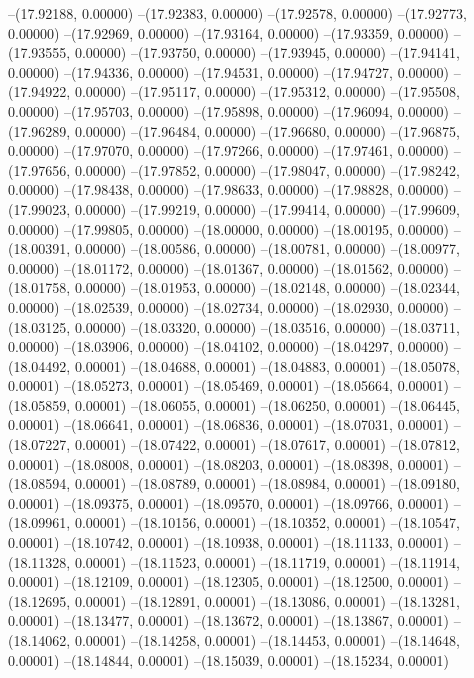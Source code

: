 --(17.92188, 0.00000)
--(17.92383, 0.00000)
--(17.92578, 0.00000)
--(17.92773, 0.00000)
--(17.92969, 0.00000)
--(17.93164, 0.00000)
--(17.93359, 0.00000)
--(17.93555, 0.00000)
--(17.93750, 0.00000)
--(17.93945, 0.00000)
--(17.94141, 0.00000)
--(17.94336, 0.00000)
--(17.94531, 0.00000)
--(17.94727, 0.00000)
--(17.94922, 0.00000)
--(17.95117, 0.00000)
--(17.95312, 0.00000)
--(17.95508, 0.00000)
--(17.95703, 0.00000)
--(17.95898, 0.00000)
--(17.96094, 0.00000)
--(17.96289, 0.00000)
--(17.96484, 0.00000)
--(17.96680, 0.00000)
--(17.96875, 0.00000)
--(17.97070, 0.00000)
--(17.97266, 0.00000)
--(17.97461, 0.00000)
--(17.97656, 0.00000)
--(17.97852, 0.00000)
--(17.98047, 0.00000)
--(17.98242, 0.00000)
--(17.98438, 0.00000)
--(17.98633, 0.00000)
--(17.98828, 0.00000)
--(17.99023, 0.00000)
--(17.99219, 0.00000)
--(17.99414, 0.00000)
--(17.99609, 0.00000)
--(17.99805, 0.00000)
--(18.00000, 0.00000)
--(18.00195, 0.00000)
--(18.00391, 0.00000)
--(18.00586, 0.00000)
--(18.00781, 0.00000)
--(18.00977, 0.00000)
--(18.01172, 0.00000)
--(18.01367, 0.00000)
--(18.01562, 0.00000)
--(18.01758, 0.00000)
--(18.01953, 0.00000)
--(18.02148, 0.00000)
--(18.02344, 0.00000)
--(18.02539, 0.00000)
--(18.02734, 0.00000)
--(18.02930, 0.00000)
--(18.03125, 0.00000)
--(18.03320, 0.00000)
--(18.03516, 0.00000)
--(18.03711, 0.00000)
--(18.03906, 0.00000)
--(18.04102, 0.00000)
--(18.04297, 0.00000)
--(18.04492, 0.00001)
--(18.04688, 0.00001)
--(18.04883, 0.00001)
--(18.05078, 0.00001)
--(18.05273, 0.00001)
--(18.05469, 0.00001)
--(18.05664, 0.00001)
--(18.05859, 0.00001)
--(18.06055, 0.00001)
--(18.06250, 0.00001)
--(18.06445, 0.00001)
--(18.06641, 0.00001)
--(18.06836, 0.00001)
--(18.07031, 0.00001)
--(18.07227, 0.00001)
--(18.07422, 0.00001)
--(18.07617, 0.00001)
--(18.07812, 0.00001)
--(18.08008, 0.00001)
--(18.08203, 0.00001)
--(18.08398, 0.00001)
--(18.08594, 0.00001)
--(18.08789, 0.00001)
--(18.08984, 0.00001)
--(18.09180, 0.00001)
--(18.09375, 0.00001)
--(18.09570, 0.00001)
--(18.09766, 0.00001)
--(18.09961, 0.00001)
--(18.10156, 0.00001)
--(18.10352, 0.00001)
--(18.10547, 0.00001)
--(18.10742, 0.00001)
--(18.10938, 0.00001)
--(18.11133, 0.00001)
--(18.11328, 0.00001)
--(18.11523, 0.00001)
--(18.11719, 0.00001)
--(18.11914, 0.00001)
--(18.12109, 0.00001)
--(18.12305, 0.00001)
--(18.12500, 0.00001)
--(18.12695, 0.00001)
--(18.12891, 0.00001)
--(18.13086, 0.00001)
--(18.13281, 0.00001)
--(18.13477, 0.00001)
--(18.13672, 0.00001)
--(18.13867, 0.00001)
--(18.14062, 0.00001)
--(18.14258, 0.00001)
--(18.14453, 0.00001)
--(18.14648, 0.00001)
--(18.14844, 0.00001)
--(18.15039, 0.00001)
--(18.15234, 0.00001)
